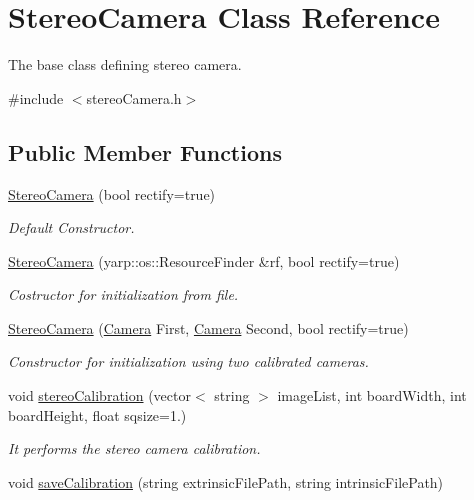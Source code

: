 \section{Stereo\+Camera Class Reference}
\label{classStereoCamera}


The base class defining stereo camera.  




{\ttfamily \#include $<$stereo\+Camera.\+h$>$}

\subsection*{Public Member Functions}
\begin{DoxyCompactItemize}
\item 
\hyperlink{classStereoCamera_a11256fe5a509436abc714a594b6cc801}{Stereo\+Camera} (bool rectify=true)
\begin{DoxyCompactList}\small\item\em Default Constructor. \end{DoxyCompactList}\item 
\hyperlink{classStereoCamera_a0c2cd4c7b5a0cdb96370c29a42601f40}{Stereo\+Camera} (yarp\+::os\+::\+Resource\+Finder \&rf, bool rectify=true)
\begin{DoxyCompactList}\small\item\em Costructor for initialization from file. \end{DoxyCompactList}\item 
\hyperlink{classStereoCamera_a5bfcf3ef7c9d45802bacbf040e7ca112}{Stereo\+Camera} (\hyperlink{classCamera}{Camera} First, \hyperlink{classCamera}{Camera} Second, bool rectify=true)
\begin{DoxyCompactList}\small\item\em Constructor for initialization using two calibrated cameras. \end{DoxyCompactList}\item 
void \hyperlink{classStereoCamera_a398f45eeefe7979a834659cfbb7a6961}{stereo\+Calibration} (vector$<$ string $>$ image\+List, int board\+Width, int board\+Height, float sqsize=1.)
\begin{DoxyCompactList}\small\item\em It performs the stereo camera calibration. \end{DoxyCompactList}\item 
void \hyperlink{classStereoCamera_a9f06cd4b170ad0ba45b681ee93d64851}{save\+Calibration} (string extrinsic\+File\+Path, string intrinsic\+File\+Path)

\end{DoxyCompactItemize}
